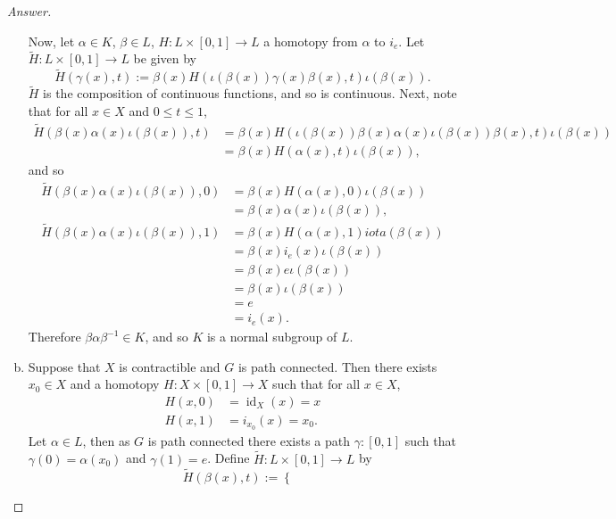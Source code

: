 \documentclass[12pt]{article}
\newcommand\inv[1]{#1^{-1}}
\newcommand\paren[1]{\left( #1 \right)}
\theoremstyle{definition}
\DeclareMathOperator\id{id}
\begin{document}
\begin{proof}[Answer]
\begin{enumerate}[(a)]
        Now, let $\alpha \in K$, $\beta \in L$, $H : L \times [0,1] \to L$ a homotopy from $\alpha$ to $i_e$. Let $\tilde{H} : L \times [0,1] \to L$ be given by 
        \[
            \tilde{H} \paren{ \gamma(x) , t } := \beta(x)H \paren{ \iota(\beta(x))\gamma(x) \beta(x) , t }\iota( \beta(x) ).
        \]
        $\tilde{H}$ is the composition of continuous functions, and so is continuous. Next, note that for all $x \in X$ and $0 \leq t \leq 1$,
        \begin{align*}
            \tilde{H} \paren{ \beta(x) \alpha(x) \iota(\beta(x)) , t } & = \beta(x)H \paren{ \iota(\beta(x))\beta(x) \alpha(x)\iota(\beta(x)) \beta(x) , t }\iota( \beta(x) ) \\
            & = \beta(x)H \paren{ \alpha(x), t }\iota( \beta(x) ),
        \end{align*}
        and so 
        \begin{align*}
            \tilde{H} \paren{ \beta(x) \alpha(x) \iota(\beta(x)) , 0 } & = \beta(x)H \paren{ \alpha(x), 0 }\iota( \beta(x) ) \\
            & = \beta(x)\alpha(x)\iota(\beta(x)), \\
            \tilde{H} \paren{ \beta(x) \alpha(x) \iota(\beta(x)) , 1 } & = \beta(x)H \paren{ \alpha(x), 1 }iota( \beta(x) ) \\
            & = \beta(x)i_e(x)\iota(\beta(x)) \\ & = \beta(x)e\iota(\beta(x)) \\
            & = \beta(x)\iota(\beta(x)) \\
            & = e \\
            & = i_e(x).
        \end{align*}
        Therefore $\beta \alpha \inv{\beta} \in K$, and so $K$ is a normal subgroup of $L$.
        \item Suppose that $X$ is contractible and $G$ is path connected. Then there exists $x_0 \in X$ and a homotopy $H : X \times [0,1] \to X$ such that for all $x \in X$,
        \begin{align*}
            H(x,0) & = \id_X(x) = x \\
            H(x,1) & = i_{x_0}(x) = x_0.
        \end{align*}
        Let $\alpha \in L$, then as $G$ is path connected there exists a path $\gamma : [0,1]$ such that $\gamma(0) = \alpha(x_0)$ and $\gamma(1) = e$. Define $\tilde{H} : L \times [0,1] \to L$ by 
        \[
            \tilde{H} \paren{ \beta(x) , t } := 
            \begin{cases}

\end{cases}\]
\end{enumerate}
\end{proof}
\end{document}
